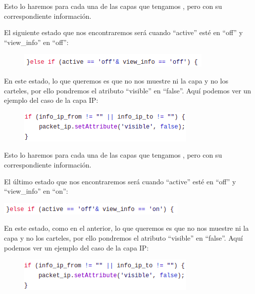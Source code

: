 \documentclass[a4paper, 12pt]{book}
\begin{document}
Esto lo haremos para cada una de las capas que tengamos , pero con su correspondiente información.

El siguiente estado que nos encontraremos será cuando “active” esté en “off” y “view\_info” en “off”:

\begin{figure}[h]
\centering
    \includegraphics[scale=0.7]{img/eventlist3_comp_pack.png}
\end{figure}
\newpage
En este estado, lo que queremos es que no nos muestre ni la capa y no los carteles, por ello pondremos el atributo “visible” en “false”. Aquí podemos ver un ejemplo del caso de la capa IP:

\begin{figure}[h]
\centering
    \includegraphics[scale=0.8]{img/ejemplo3ip_comp_pack.png}
\end{figure}

Esto lo haremos para cada una de las capas que tengamos , pero con su correspondiente información.

El último estado que nos encontraremos será cuando “active” esté en “off” y “view\_info” en “on”:

\begin{center}
    \includegraphics[scale=0.7]{img/eventlist4_comp_pack.png}
\end{center}

En este estado, como en el anterior, lo que queremos es que no nos muestre ni la capa y no los carteles, por ello pondremos el atributo “visible” en “false”. Aquí podemos ver un ejemplo del caso de la capa IP:

\begin{figure}[h]
\centering
    \includegraphics[scale=0.8]{img/ejemplo4ip_comp_pack.png}
\end{figure}
\end{document}
